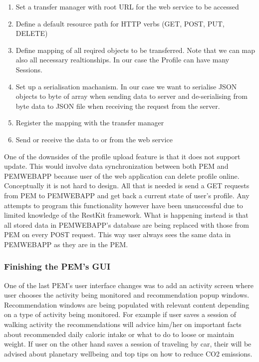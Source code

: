 \documentclass[12pt, a4paper]{report}   %
\begin{document}
\begin{enumerate}
\begin{enumerate}
	\item Set a transfer manager with root URL for the web service to be accessed
    \item Define a default resource path for HTTP verbs (GET, POST, PUT, DELETE)    
    \item Define mapping of all reqired objects to be transferred. Note that we can map also all necessary realtionships. In our case the Profile can have many Sessions.
	\item Set up a serialisation machanism. In our case we want to serialise JSON objects to byte of array when sending data to server and de-serialising from byte data to JSON file when receiving the request from the server.
    \item Register the mapping with the transfer manager
	\item Send or receive the data to or from the web service\\
\end{enumerate}
One of the downsides of the profile upload feature is that it does not support update. This would involve data synchronization between both PEM and PEMWEBAPP because user of the web application can delete profile online. Conceptually it is not hard to design. All that is needed is send a GET requests from PEM to PEMWEBAPP and get back a current state of user's profile. Any attempts to program this functionality however have been unsuccessful due to limited knowledge of the RestKit framework. What is happening instead is that all stored data in PEMWEBAPP's database are being replaced with those from PEM on every POST request. This way user always sees the same data in PEMWEBAPP as they are in the PEM.


\subsubsection{Finishing the PEM's GUI}
One of the last PEM's user interface changes was to add an activity screen where user chooses the activity being monitored and recommendation popup windows. Recommendation windows are being populated with relevant content depending on a type of activity being monitored. For example if user saves a session of walking activity the recommendations will advice him/her on important facts about recommended daily caloric intake or what to do to loose or maintain weight. If user on the other hand saves a session of traveling by car, their will be advised about planetary wellbeing and top tips on how to reduce CO2 emissions.



\end{enumerate}
\end{document}
